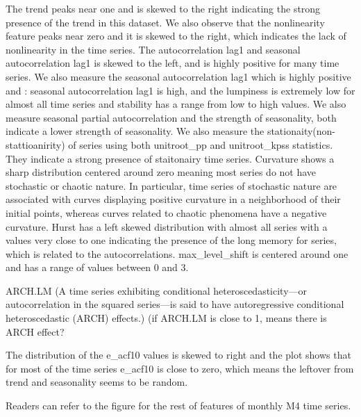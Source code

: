 \documentclass[preprint, 3p,
authoryear]{elsarticle} %
\begin{document}
The trend peaks near one and is skewed to the right indicating the
strong presence of the trend in this dataset. We also observe that the
nonlinearity feature peaks near zero and it is skewed to the right,
which indicates the lack of nonlinearity in the time series. The
autocorrelation lag1 and seasonal autocorrelation lag1 is skewed to the
left, and is highly positive for many time series. We also measure the
seasonal autocorrelation lag1 which is highly positive and : seasonal
autocorrelation lag1 is high, and the lumpiness is extremely low for
almost all time series and stability has a range from low to high
values. We also measure seasonal partial autocorrelation and the
strength of seasonality, both indicate a lower strength of seasonality.
We also measure the stationaity(non-stattioanirity) of series using both
unitroot\_pp and unitroot\_kpss statistics. They indicate a strong
presence of staitonairy time series. Curvature shows a sharp
distribution centered around zero meaning most series do not have
stochastic or chaotic nature. In particular, time series of stochastic
nature are associated with curves displaying positive curvature in a
neighborhood of their initial points, whereas curves related to chaotic
phenomena have a negative curvature. Hurst has a left skewed
distribution with almost all series with a values very close to one
indicating the presence of the long memory for series, which is related
to the autocorrelations. max\_level\_shift is centered around one and
has a range of values between 0 and 3.

ARCH.LM (A time series exhibiting conditional heteroscedasticity---or
autocorrelation in the squared series---is said to have autoregressive
conditional heteroscedastic (ARCH) effects.) (if ARCH.LM is close to 1,
means there is ARCH effect?

The distribution of the e\_acf10 values is skewed to right and the plot
shows that for most of the time series e\_acf10 is close to zero, which
means the leftover from trend and seasonality seems to be random.

Readers can refer to the figure for the rest of features of monthly M4
time series.
\end{document}
